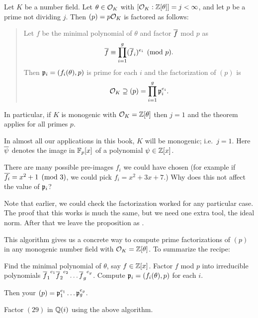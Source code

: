 \begin{theorem}
	\label{thm:factor_alg}
	Let $K$ be a number field.
	Let $\theta \in \mathcal O_K$ with $[\mathcal O_K : \mathbb Z[\theta]] = j < \infty$,
	and let $p$ be a prime not dividing $j$.
	Then $(p) = p \mathcal O_K$ is factored as follows:
	\begin{quote}
		Let $f$ be the minimal polynomial of $\theta$ and
		factor $\overline f$ mod $p$ as \[ \overline f \equiv \prod_{i=1}^g (\overline f_i)^{e_i} \pmod p. \]
		Then $\mathfrak p_i = (f_i(\theta), p)$ is prime for each $i$
		and the factorization of $(p)$ is
		\[ \mathcal O_K \supseteq (p) = \prod_{i=1}^g \mathfrak p_i^{e_i}. \]
	\end{quote}
	In particular, if $K$ is monogenic with $\mathcal O_K = \mathbb Z[\theta]$ then $j=1$
	and the theorem applies for all primes $p$.
\end{theorem}
In almost all our applications in this book, $K$ will be monogenic; i.e.\ $j=1$.
Here $\overline \psi$ denotes the image in $\mathbb F_p[x]$ of a polynomial $\psi \in \mathbb Z[x]$.

\begin{ques}
	There are many possible pre-images $f_i$ we could have chosen
	(for example if $\overline{f_i} = x^2+1 \pmod 3$, we could pick $f_i = x^2 + 3x + 7$.)
	Why does this not affect the value of $\mathfrak p_i$?
\end{ques}

Note that earlier, we could check the factorization worked
for any particular case. 
The proof that this works is much the same, but we need one extra tool, the ideal norm.
After that we leave the proposition as .

This algorithm gives us a concrete way to compute prime factorizations of $(p)$
in any monogenic number field with $\mathcal O_K = \mathbb Z[\theta]$. To summarize the recipe:
\begin{enumerate}
	\ii Find the minimal polynomial of $\theta$, say $f \in \mathbb Z[x]$.
	\ii Factor $f$ mod $p$ into irreducible polynomials
	${\overline f_1}^{e_1} {\overline f_2}^{e_2} \dots {\overline f_g}^{e_g}$.
	\ii Compute $\mathfrak p_i = (f_i(\theta), p)$ for each $i$.
\end{enumerate}
Then your $(p) = \mathfrak p_1^{e_1} \dots \mathfrak p_g^{e_g}$.

\begin{exercise}
	Factor $(29)$ in $\mathbb Q(i)$ using the above algorithm.
\end{exercise}


